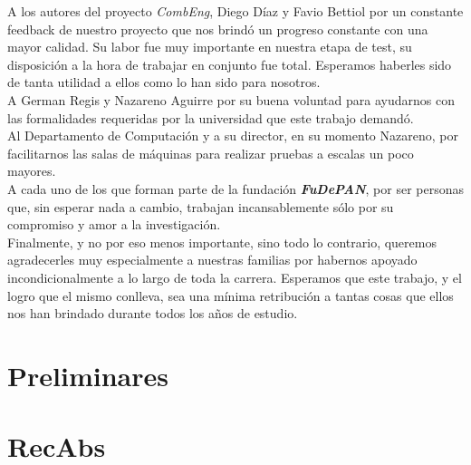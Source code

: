 \documentclass[a4paper,12pt]{report}
\def\fude {\textbf{\textit{FuDePAN}}}
\begin{document}
A los autores del proyecto \emph{CombEng}, Diego Díaz y Favio Bettiol por un constante feedback de nuestro proyecto que nos brindó un
progreso constante con una mayor calidad. Su labor fue muy importante en nuestra etapa de test, su disposición a la hora de trabajar en
conjunto fue total. Esperamos haberles sido de tanta utilidad a ellos como lo han sido para nosotros.\\

A German Regis y Nazareno Aguirre por su buena voluntad para ayudarnos con las formalidades requeridas por la universidad que este trabajo
demandó.\\

Al Departamento de Computación y a su director, en su momento Nazareno, por facilitarnos las salas de máquinas para realizar pruebas a
escalas un poco mayores.\\

A cada uno de los que forman parte de la fundación \fude{}, por ser personas que, sin esperar nada a cambio, trabajan incansablemente sólo
por su compromiso y amor a la investigación.\\

Finalmente, y no por eso menos importante, sino todo lo contrario, queremos agradecerles muy especialmente a nuestras familias por habernos
apoyado incondicionalmente a lo largo de toda la carrera. Esperamos que este trabajo, y el logro que el mismo conlleva, sea una mínima
retribución a tantas cosas que ellos nos han brindado durante todos los años de estudio.\\

    \newpage

    \tableofcontents
    \newpage
    
	\listoffigures
	\newpage

    \listoftables
    \newpage

	
    \part{Preliminares}
    \label{part:prelim}

    
    
    

    \part{RecAbs}
    \label{part:recabs}
\end{document}
